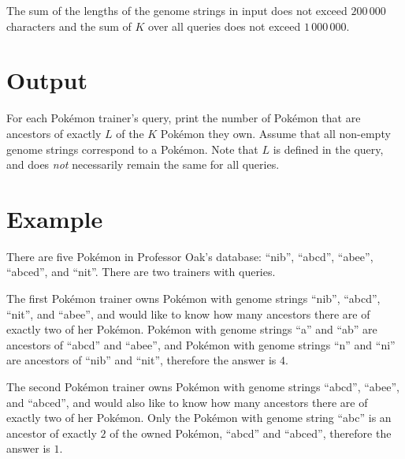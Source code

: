 The sum of the lengths of the genome strings in input does not exceed 
$200\,000$ characters and the sum of $K$ over all queries does not exceed 
$1\,000\,000$.

\section*{Output}

For each Pokémon trainer's query, print the number of Pokémon
that are ancestors of exactly $L$ of the $K$ Pokémon they own.
Assume that all non-empty genome strings correspond to a Pokémon. Note that $L$ 
is defined in the query, and does \textit{not} necessarily remain the same for 
all queries.

\section*{Example}

There are five Pokémon in Professor Oak's database: ``nib'', ``abcd'', ``abee'', ``abced'', and ``nit''. There are two trainers with queries. 

The first Pokémon trainer owns Pokémon with genome strings ``nib'', ``abcd'', ``nit'', and ``abee'',
and would like to know how many ancestors there are of exactly two of her Pokémon. 
Pokémon with genome strings ``a'' and ``ab'' are ancestors of ``abcd'' and ``abee'', and Pokémon 
with genome strings ``n'' and ``ni'' are ancestors of ``nib'' and ``nit'', therefore the answer is $4$.

The second Pokémon trainer owns Pokémon with genome strings ``abcd'', ``abee'', and ``abced'',
and would also like to know how many ancestors there are of exactly two of her Pokémon.
Only the Pokémon with genome string ``abc'' is an ancestor of exactly $2$ of the owned Pokémon,
``abcd'' and ``abced'', therefore the answer is $1$.
